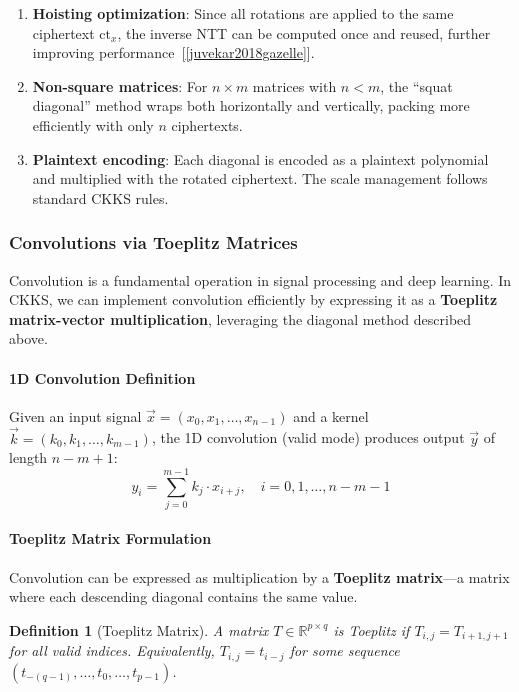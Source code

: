 \documentclass[11pt,a4paper]{article}
\newtheorem{definition}{Definition}
\begin{document}
\begin{enumerate}
    \item \textbf{Hoisting optimization}: Since all rotations are applied to the same ciphertext $\text{ct}_x$, the inverse NTT can be computed once and reused, further improving performance~[\ref{juvekar2018gazelle}].
    
    \item \textbf{Non-square matrices}: For $n \times m$ matrices with $n < m$, the ``squat diagonal'' method wraps both horizontally and vertically, packing more efficiently with only $n$ ciphertexts.
    
    \item \textbf{Plaintext encoding}: Each diagonal is encoded as a plaintext polynomial and multiplied with the rotated ciphertext. The scale management follows standard CKKS rules.
\end{enumerate}

\subsubsection{Convolutions via Toeplitz Matrices}

Convolution is a fundamental operation in signal processing and deep learning. In CKKS, we can implement convolution efficiently by expressing it as a \textbf{Toeplitz matrix-vector multiplication}, leveraging the diagonal method described above.

\paragraph{1D Convolution Definition}

Given an input signal $\vec{x} = (x_0, x_1, \ldots, x_{n-1})$ and a kernel $\vec{k} = (k_0, k_1, \ldots, k_{m-1})$, the 1D convolution (valid mode) produces output $\vec{y}$ of length $n - m + 1$:
\[
y_i = \sum_{j=0}^{m-1} k_j \cdot x_{i+j}, \quad i = 0, 1, \ldots, n - m - 1
\]

\paragraph{Toeplitz Matrix Formulation}

Convolution can be expressed as multiplication by a \textbf{Toeplitz matrix}—a matrix where each descending diagonal contains the same value.

\begin{definition}[Toeplitz Matrix]
A matrix $T \in \mathbb{R}^{p \times q}$ is Toeplitz if $T_{i,j} = T_{i+1,j+1}$ for all valid indices. Equivalently, $T_{i,j} = t_{i-j}$ for some sequence $(t_{-(q-1)}, \ldots, t_0, \ldots, t_{p-1})$.
\end{definition}
\end{document}

